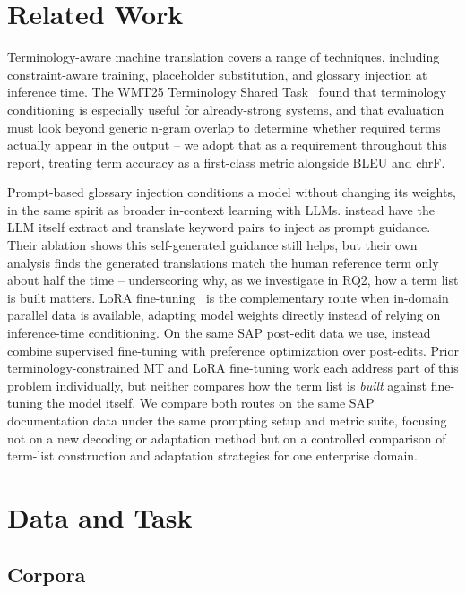 \documentclass[11pt]{article}
\begin{document}
\section{Related Work}
\label{sec:related-work}

Terminology-aware machine translation covers a range of techniques, including constraint-aware training, placeholder substitution, and glossary injection at inference time. The WMT25 Terminology Shared Task~\citep{semenov-etal-2025-wmt25} found that terminology conditioning is especially useful for already-strong systems, and that evaluation must look beyond generic n-gram overlap to determine whether required terms actually appear in the output -- we adopt that as a requirement throughout this report, treating term accuracy as a first-class metric alongside BLEU and chrF.

Prompt-based glossary injection conditions a model without changing its weights, in the same spirit as broader in-context learning with LLMs. \citet{he-etal-2024-exploring} instead have the LLM itself extract and translate keyword pairs to inject as prompt guidance. Their ablation shows this self-generated guidance still helps, but their own analysis finds the generated translations match the human reference term only about half the time -- underscoring why, as we investigate in RQ2, how a term list is built matters. LoRA fine-tuning~\citep{hu2022lora} is the complementary route when in-domain parallel data is available, adapting model weights directly instead of relying on inference-time conditioning. On the same SAP post-edit data we use, \citet{berger-etal-2025-learning} instead combine supervised fine-tuning with preference optimization over post-edits. Prior terminology-constrained MT and LoRA fine-tuning work each address part of this problem individually, but neither compares how the term list is \emph{built} against fine-tuning the model itself. We compare both routes on the same SAP documentation data under the same prompting setup and metric suite, focusing not on a new decoding or adaptation method but on a controlled comparison of term-list construction and adaptation strategies for one enterprise domain.

\section{Data and Task}
\label{sec:data-and-task}

\subsection{Corpora}
\label{sec:corpora}
\end{document}
